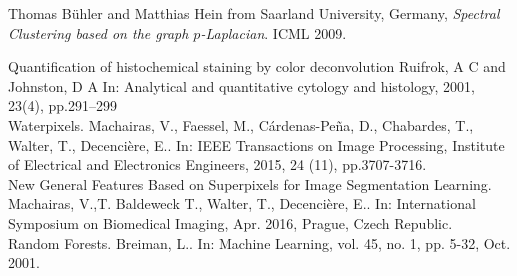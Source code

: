 \documentclass{article}
\begin{document}
\begin{thebibliography}{9}

 Thomas Bühler and Matthias Hein from Saarland University, Germany, \textit{Spectral Clustering based on the graph $p$-Laplacian}. ICML 2009.

Quantification of histochemical staining by color deconvolution
Ruifrok, A C and Johnston, D A
In: Analytical and quantitative cytology and histology, 2001, 23(4), pp.291--299\\

Waterpixels.
Machairas, V., Faessel, M., C\'ardenas-Pe\~na, D., Chabardes, T., Walter, T., Decenci\`ere, E..
In: IEEE Transactions on Image Processing, Institute of Electrical and Electronics Engineers, 2015, 24 (11), pp.3707-3716.\\

New General Features Based on Superpixels for Image Segmentation Learning.
Machairas, V.,T. Baldeweck T., Walter, T., Decenci\`ere, E..
In: International Symposium on Biomedical Imaging, Apr. 2016, Prague, Czech Republic.\\

Random Forests.
Breiman, L..
In: Machine Learning, vol. 45, no. 1, pp. 5-32, Oct. 2001.

\end{thebibliography}
\end{document}
